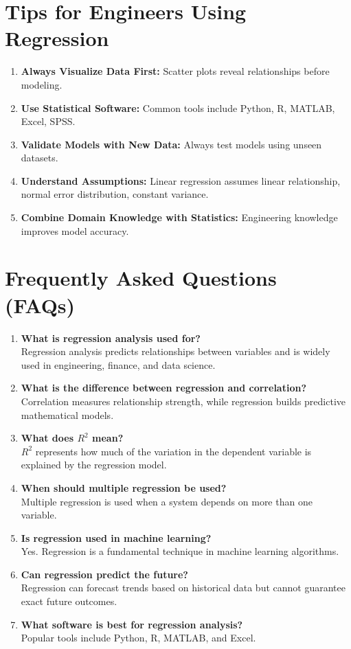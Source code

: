 \documentclass[12pt,a4paper]{article}
\begin{document}
	\section{Tips for Engineers Using Regression}
	\begin{enumerate}
		\item \textbf{Always Visualize Data First:} Scatter plots reveal relationships before modeling.
		\item \textbf{Use Statistical Software:} Common tools include Python, R, MATLAB, Excel, SPSS.
		\item \textbf{Validate Models with New Data:} Always test models using unseen datasets.
		\item \textbf{Understand Assumptions:} Linear regression assumes linear relationship, normal error distribution, constant variance.
		\item \textbf{Combine Domain Knowledge with Statistics:} Engineering knowledge improves model accuracy.
	\end{enumerate}
	
	\section{Frequently Asked Questions (FAQs)}
	
	\begin{enumerate}
		\item \textbf{What is regression analysis used for?} \\
		Regression analysis predicts relationships between variables and is widely used in engineering, finance, and data science.
		
		\item \textbf{What is the difference between regression and correlation?} \\
		Correlation measures relationship strength, while regression builds predictive mathematical models.
		
		\item \textbf{What does $R^2$ mean?} \\
		$R^2$ represents how much of the variation in the dependent variable is explained by the regression model.
		
		\item \textbf{When should multiple regression be used?} \\
		Multiple regression is used when a system depends on more than one variable.
		
		\item \textbf{Is regression used in machine learning?} \\
		Yes. Regression is a fundamental technique in machine learning algorithms.
		
		\item \textbf{Can regression predict the future?} \\
		Regression can forecast trends based on historical data but cannot guarantee exact future outcomes.
		
		\item \textbf{What software is best for regression analysis?} \\
		Popular tools include Python, R, MATLAB, and Excel.
	\end{enumerate}
	
\end{document}
